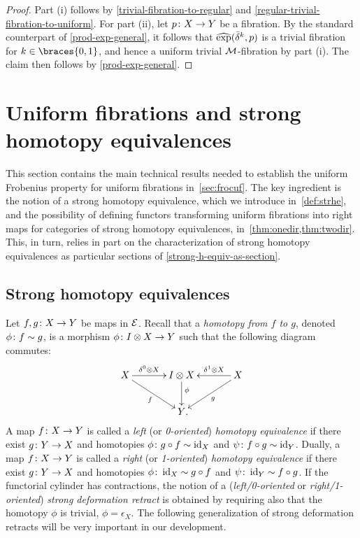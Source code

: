 \documentclass[reqno,10pt,a4paper,oneside,draft]{amsart}
\begin{document}
\begin{proof}
Part (i) follows by \cref{trivial-fibration-to-regular} and \cref{regular-trivial-fibration-to-uniform}.
For part (ii), let $p \co X \to Y$ be a fibration.
By the standard counterpart of \cref{prod-exp-general}, it follows that $\hatexp(\bar{\delta}^k, p)$ is a trivial fibration for $k \in \braces{0, 1}$, and hence a uniform trivial $\cal{M}$-fibration by part (i).
The claim then follows by \cref{prod-exp-general}.
\end{proof}




\section{Uniform fibrations and strong homotopy equivalences}
\label{sec:unifshe}


This section contains the main technical results needed to establish the uniform Frobenius property for uniform fibrations in~\cref{sec:frocuf}. The key ingredient is the notion of a 
strong homotopy equivalence, which we introduce in~\cref{def:strhe}, and the possibility 
of defining functors transforming uniform fibrations into right maps for  categories of
strong homotopy equivalences, in~\cref{thm:onedir,thm:twodir}. This, in turn, 
relies in part on the characterization of strong homotopy equivalences
 as particular sections of \cref{strong-h-equiv-as-section}. 



\subsection*{Strong homotopy equivalences}
Let $f, g \co X \to Y$ be maps in $\catE$.
Recall that a \emph{homotopy from $f$ to $g$}, denoted $\phi \co f \sim g$, is a morphism $\phi \co \interval \otimes X \to Y$ such that the following diagram commutes:
\begin{equation}
\label{equ:homotopy}
\begin{gathered}
\xymatrix@C=1.2cm{
  X
  \ar[r]^-{\lcyl \otimes X}
  \ar[dr]_{f}
&
  \interval \otimes X
  \ar[d]^(0.4){\phi}
&
  X
  \ar[dl]^{g}
  \ar[l]_-{\rcyl \otimes X}
\\&
  Y
\rlap{.}}
\end{gathered}
\end{equation}
A map $f \co X \to Y$ is called a \emph{left} (or \emph{0-oriented}) \emph{homotopy equivalence} if there exist $g \co Y \to X$ and homotopies $\phi \co g \cc f \sim \id_X $ and $\psi \co f \cc g \sim \id_Y$.
Dually, a map $f \co X \to Y$ is called a \emph{right} (or \emph{1-oriented}) \emph{homotopy equivalence} if there exist $g \co Y \to X$ and homotopies $\phi \co \id_X \sim g \cc f$ and $\psi \co \id_Y \sim f \cc g$.
If the functorial cylinder has contractions, the notion of a (\emph{left/0-oriented} or \emph{right/1-oriented}) \emph{strong deformation retract} is obtained by requiring also that the homotopy $\phi$ is trivial, \ie $\phi = \epsilon_X$.
The following generalization of strong deformation retracts will be very important in our development.
\end{document}
